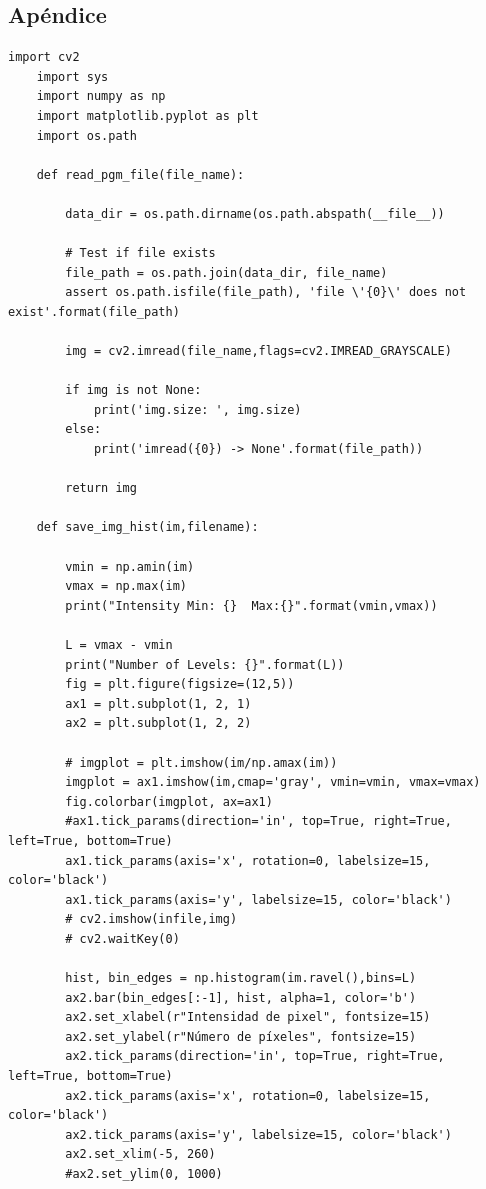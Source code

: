 \documentclass[11pt,twocolumn,twoside]{opticajnl}
\begin{document}
\begin{onecolumn} %
\appendix
\section{Apéndice \label{codigo}}
\scriptsize
\begin{lstlisting}[style=mystyle]
    import cv2
    import sys 
    import numpy as np
    import matplotlib.pyplot as plt
    import os.path
    
    def read_pgm_file(file_name):
    
        data_dir = os.path.dirname(os.path.abspath(__file__))
    
        # Test if file exists
        file_path = os.path.join(data_dir, file_name)
        assert os.path.isfile(file_path), 'file \'{0}\' does not exist'.format(file_path)
    
        img = cv2.imread(file_name,flags=cv2.IMREAD_GRAYSCALE)
    
        if img is not None:
            print('img.size: ', img.size)
        else:
            print('imread({0}) -> None'.format(file_path))
    
        return img
    
    def save_img_hist(im,filename):
        
        vmin = np.amin(im)
        vmax = np.max(im)
        print("Intensity Min: {}  Max:{}".format(vmin,vmax))
    
        L = vmax - vmin
        print("Number of Levels: {}".format(L))
        fig = plt.figure(figsize=(12,5))
        ax1 = plt.subplot(1, 2, 1)
        ax2 = plt.subplot(1, 2, 2)
    
        # imgplot = plt.imshow(im/np.amax(im))
        imgplot = ax1.imshow(im,cmap='gray', vmin=vmin, vmax=vmax)
        fig.colorbar(imgplot, ax=ax1)
        #ax1.tick_params(direction='in', top=True, right=True, left=True, bottom=True)
        ax1.tick_params(axis='x', rotation=0, labelsize=15, color='black')
        ax1.tick_params(axis='y', labelsize=15, color='black')
        # cv2.imshow(infile,img)
        # cv2.waitKey(0)
    
        hist, bin_edges = np.histogram(im.ravel(),bins=L)
        ax2.bar(bin_edges[:-1], hist, alpha=1, color='b')
        ax2.set_xlabel(r"Intensidad de pixel", fontsize=15)
        ax2.set_ylabel(r"Número de píxeles", fontsize=15)
        ax2.tick_params(direction='in', top=True, right=True, left=True, bottom=True)
        ax2.tick_params(axis='x', rotation=0, labelsize=15, color='black')
        ax2.tick_params(axis='y', labelsize=15, color='black')
        ax2.set_xlim(-5, 260)
        #ax2.set_ylim(0, 1000)
    

\end{lstlisting}
\end{onecolumn}
\end{document}
